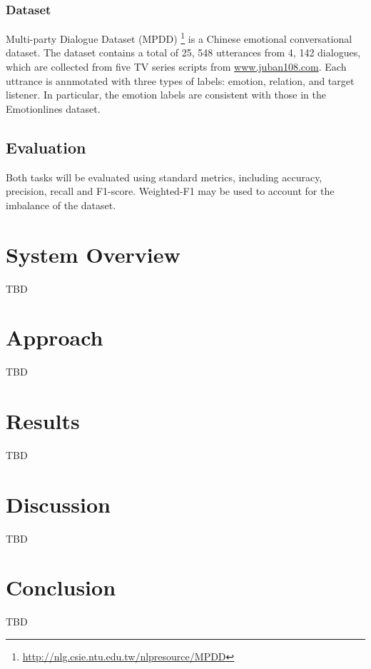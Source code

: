 \documentclass[11pt]{article}
\begin{document}
\subsubsection{Dataset}

Multi-party Dialogue Dataset (MPDD) \citep{chen-etal-2020-mpdd} \footnote{\url{http://nlg.csie.ntu.edu.tw/nlpresource/MPDD}} is a Chinese emotional conversational dataset. The dataset contains a total of 25, 548 utterances from 4, 142 dialogues, which are collected from five TV series scripts from \url{www.juban108.com}. Each uttrance is annmotated with three types of labels: emotion, relation, and target listener. In particular, the emotion labels are consistent with those in the Emotionlines dataset.

\subsection{Evaluation}
Both tasks will be evaluated using standard metrics, including accuracy, precision, recall and F1-score. Weighted-F1 may be used to account for the imbalance of the dataset.

\section{System Overview}
\label{sec:overview}

TBD

\section{Approach}
\label{sec:approach}

TBD


\section{Results}
\label{sec:results}

TBD


\section{Discussion}

TBD


\section{Conclusion}
\label{sect:conclusion}

TBD


\end{document}
